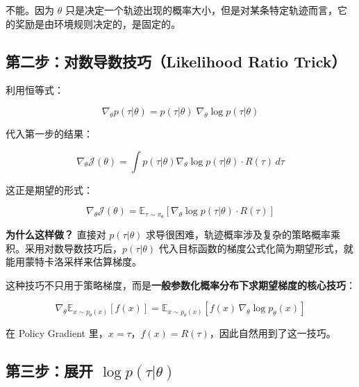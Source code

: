 \documentclass[12pt,a4paper]{article}
\newcommand{\E}{\mathbb{E}}
\newcommand{\grad}{\nabla}
\theoremstyle{noteplain}
\theoremstyle{noteexercise}
\begin{document}
\begin{keypoint}[答]
  不能。因为 $\theta$ 只是决定一个轨迹出现的概率大小，但是对某条特定轨迹而言，它的奖励是由环境规则决定的，是固定的。
\end{keypoint}

\subsection{第二步：对数导数技巧（Likelihood Ratio Trick）}\label{ssec:step2}

利用恒等式：

\begin{equation}\label{eq:log-deriv}
  \grad_\theta p(\tau|\theta) = p(\tau|\theta) \; \grad_\theta \log p(\tau|\theta)
\end{equation}

代入第一步的结果：

\begin{equation}\label{eq:grad-after-log}
  \grad_\theta \mathcal{J}(\theta)
  = \int p(\tau|\theta) \grad_\theta \log p(\tau|\theta) \cdot R(\tau)\, d\tau
\end{equation}

这正是期望的形式：

\begin{equation}\label{eq:grad-expectation}
  \grad_\theta \mathcal{J}(\theta) = \E_{\tau\sim\pi_\theta}\left[ \grad_\theta \log p(\tau|\theta) \cdot R(\tau) \right]
\end{equation}

\textbf{为什么这样做？} 直接对 $p(\tau|\theta)$ 求导很困难，轨迹概率涉及复杂的策略概率乘积。采用对数导数技巧后，$p(\tau|\theta)$ 代入目标函数的梯度公式化简为期望形式，就能用蒙特卡洛采样来估算梯度。

\begin{summarybox}
  这种技巧不只用于策略梯度，而是\textbf{一般参数化概率分布下求期望梯度的核心技巧}：

  \begin{equation}\label{eq:general-likelihood}
    \grad_{\theta} \E_{x\sim p_{\theta}(x)}[f(x)]
    = \E_{x\sim p_{\theta}(x)}\left[ f(x) \, \grad_{\theta} \log p_{\theta}(x) \right]
  \end{equation}

  在 Policy Gradient 里，$x = \tau$，$f(x) = R(\tau)$，因此自然用到了这一技巧。
\end{summarybox}

\subsection{第三步：展开 $\log p(\tau|\theta)$}\label{ssec:step3}
\end{document}

